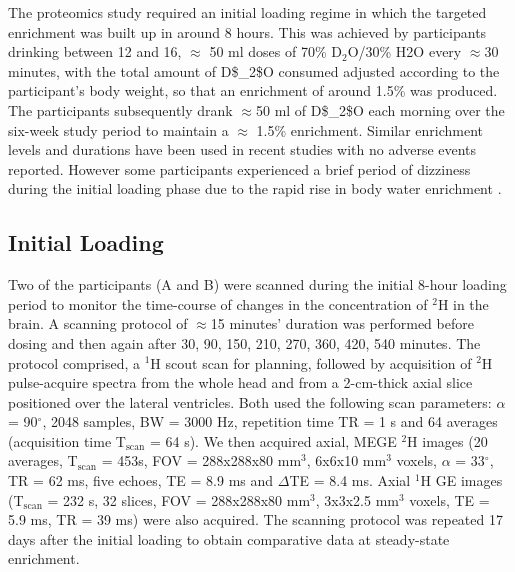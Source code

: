 The proteomics study required an initial loading regime in which the targeted enrichment was built up in around 8 hours. This was achieved by participants drinking between 12 and 16, $\approx$ 50 ml doses of 70\% D$_2$O/30\% H2O every $\approx$30 minutes, with the total amount of \ac{D$_2$O} consumed adjusted according to the participant’s body weight, so that an enrichment of around 1.5\% was produced. The participants subsequently drank $\approx$50 ml of \ac{D$_2$O} each morning over the six-week study period to maintain a $\approx$ 1.5\% enrichment. Similar enrichment levels and durations have been used in recent studies \cite{Robinson2011Long-termSupplementation, Burger2017LeukemiaIbrutinib, Loomba2019DiscoveryLabeling} with no adverse events reported. However some participants experienced a brief period of dizziness during the initial loading phase due to the rapid rise in body water enrichment \cite{Robinson2011Long-termSupplementation}. 


\subsection{Initial Loading}

Two of the participants (A and B) were scanned during the initial 8-hour loading period to monitor the time-course of changes in the concentration of $^2$H in the brain. A scanning protocol of $\approx$15 minutes’ duration was performed before dosing and then again after 30, 90, 150, 210, 270, 360, 420, 540 minutes. The protocol comprised, a $^1$H scout scan for planning, followed by acquisition of $^2$H pulse-acquire spectra from the whole head and from a 2-cm-thick axial slice positioned over the lateral ventricles. Both used the following scan parameters: $\alpha$ = 90$^\circ$, 2048 samples, \ac{BW} = 3000 Hz, repetition time TR = 1 s and 64 averages (acquisition time T$_\text{scan}$ = 64 s). We then acquired axial, \ac{MEGE} $^2$H images (20 averages, T$_\text{scan}$ = 453s, \ac{FOV} = 288x288x80 mm$^3$, 6x6x10 mm$^3$ voxels, $\alpha$ = 33$^\circ$, \ac{TR} = 62 ms, five echoes, \ac{TE} = 8.9 ms and $\Delta$\ac{TE} = 8.4 ms. Axial $^1$H \ac{GE} images (T$_\text{scan}$ = 232 s, 32 slices, \ac{FOV} = 288x288x80 mm$^3$, 3x3x2.5 mm$^3$ voxels, \ac{TE} = 5.9 ms, \ac{TR} = 39 ms) were also acquired. The scanning protocol was repeated 17 days after the initial loading to obtain comparative data at steady-state enrichment. 

